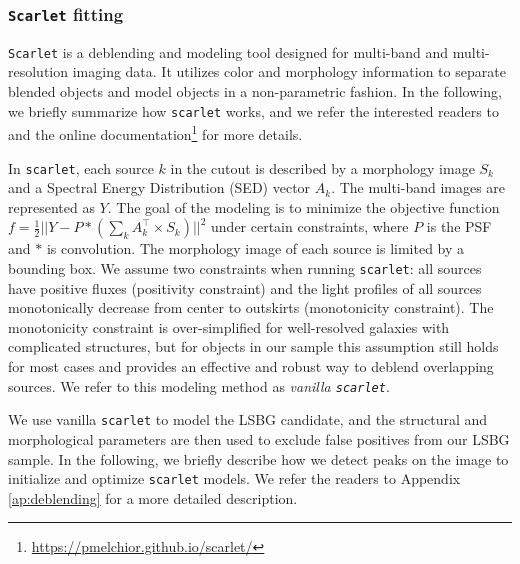 \documentclass[twocolumn,astrosymb,twocolappendix]{aastex631}
\newcommand{\code}[1]{\texttt{#1}}
\begin{document}
\begin{CJK*}{UTF8}{gbsn}
\subsubsection{\code{Scarlet} fitting}
\code{Scarlet} is a deblending and modeling tool designed for multi-band and multi-resolution imaging data. It utilizes color and morphology information to separate blended objects and model objects in a non-parametric fashion. In the following, we briefly summarize how \code{scarlet} works, and we refer the interested readers to \citet{Melchior2018,Melchior2021} and the online documentation\footnote{\url{https://pmelchior.github.io/scarlet/}} for more details. 

In \code{scarlet}, each source $k$ in the cutout is described by a morphology image $S_k$ and a Spectral Energy Distribution (SED) vector $A_k$. The multi-band images are represented as $Y$. The goal of the modeling is to minimize the objective function $f = \frac{1}{2} ||Y - P \ast (\sum_k A_k^\top \times S_k)||^{2}$ under certain constraints, where $P$ is the PSF and $*$ is convolution. The morphology image of each source is limited by a bounding box. We assume two constraints when running \code{scarlet}: all sources have positive fluxes (positivity constraint) and the light profiles of all sources monotonically decrease from center to outskirts (monotonicity constraint). The monotonicity constraint is over-simplified for well-resolved galaxies with complicated structures, but for objects in our sample this assumption still holds for most cases and provides an effective and robust way to deblend overlapping sources. We refer to this modeling method as \textit{vanilla \code{scarlet}}. 


We use vanilla \code{scarlet} to model the LSBG candidate, and the structural and morphological parameters are then used to exclude false positives from our LSBG sample. In the following, we briefly describe how we detect peaks on the image to initialize and optimize \code{scarlet} models. We refer the readers to Appendix \ref{ap:deblending} for a more detailed description. 


\end{CJK*}
\end{document}

